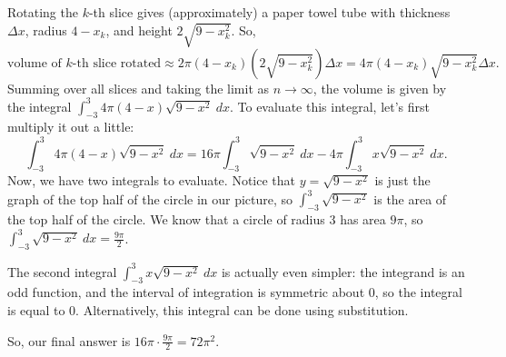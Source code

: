\documentclass[main]{subfiles}
\begin{document}
\begin{enumerate}
\begin{solution}
  Rotating the $k$-th slice gives (approximately) a paper towel tube
  with thickness $\Delta x$, radius $4 - x_k$, and height $2 \sqrt{9 -
  x_k^2}$.  So,
  \[ \textrm{volume of $k$-th slice rotated} \approx 2 \pi (4 - x_k)
  \left(2 \sqrt{9 - x_k^2} \right) \Delta x = 4 \pi (4 - x_k) \sqrt{9 -
  x_k^2} \Delta x.\] Summing over all slices and taking the limit as
  $n \to \infty$, the volume is given by the integral $\displaystyle
  \int_{-3}^3 4 \pi (4 - x) \sqrt{9 - x^2}~dx$.  To evaluate this
  integral, let's first multiply it out a little:
  \[ \int_{-3}^3 4 \pi (4 - x) \sqrt{9 - x^2}~dx = 16 \pi \int_{-3}^3
  \sqrt{9 - x^2}~dx - 4 \pi \int_{-3}^3 x \sqrt{9 - x^2}~dx.\] Now, we
  have two integrals to evaluate.  Notice that $y = \sqrt{9 - x^2}$ is
  just the graph of the top half of the circle in our picture, so
  $\displaystyle \int_{-3}^3 \sqrt{9 - x^2}$ is the area of the top half
  of the circle.  We know that a circle of radius 3 has area $9 \pi$, so
  $\displaystyle \int_{-3}^3 \sqrt{9 - x^2}~dx = \frac{9 \pi}{2}$.

  The second integral $\displaystyle \int_{-3}^3 x \sqrt{9 - x^2}~dx$
  is actually even simpler: the integrand is an odd function, and the
  interval of integration is symmetric about 0, so the integral is
  equal to 0.  Alternatively, this integral can be done using
  substitution.  

  So, our final answer is $16 \pi \cdot \frac{9 \pi}{2} = \boxed{72
  \pi^2}$.
  \end{solution}
 
 
 
 
 
 
 
 
  



\end{enumerate}
\end{document}

